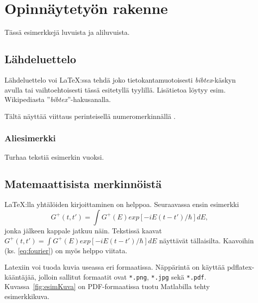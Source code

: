\chapter{Opinnäytetyön rakenne}

Tässä esimerkkejä luvuista ja aliluvuista.

\section{Lähdeluettelo}

Lähdeluettelo voi \LaTeX:ssa tehdä joko tietokantamuotoisesti
\textit{bibtex}-käskyn avulla tai vaihtoehtoisesti tässä esitetyllä tyylillä.
Lisätietoa löytyy esim. Wikipediasta ''\textit{bibtex}''-hakusanalla.

Tältä näyttää viittaus perinteisellä numeromerkinnällä \cite{Hirs,Mittelbach}.

%
%

\subsection{Aliesimerkki}

Turhaa tekstiä esimerkin vuoksi.

\section{Matemaattisista merkinnöistä}

\LaTeX:lla yhtälöiden kirjoittaminen on helppoa. Seuraavassa ensin esimerkki
\begin{equation}
  \label{eq:fourier}
  G^+(t,t')= \int G^+(E) exp[-iE(t-t')/\hbar] dE,
\end{equation}
jonka jälkeen kappale jatkuu näin.
Tekstissä kaavat $G^+(t,t')= \int G^+(E) exp[-iE(t-t')/\hbar] dE$ näyttävät
tällaisilta. Kaavoihin (ks. \ref{eq:fourier}) on myös helppo viitata.

%


Latexiin voi tuoda kuvia useassa eri formaatissa.
Näppärintä on käyttää pdflatex-kääntäjää, jolloin
sallitut formaatit ovat \verb+*.png+, \verb+*.jpg+
sekä \verb+*.pdf+. Kuvassa~\ref{fig:esimKuva} on
PDF-formaatissa tuotu Matlabilla tehty
esimerkkikuva.
